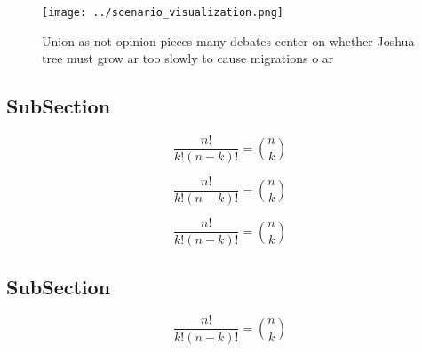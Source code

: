 \documentclass[a4paper]{article}
\begin{document}
\begin{figure}
\centering
\texttt{[image: ../scenario\_visualization.png]}
\caption{Union as not opinion pieces many debates center on whether Joshua tree must grow ar too slowly to cause migrations o ar
}
\end{figure}
 
\subsection{SubSection}

\[ \frac{n!}{k!(n-k)!} = \binom{n}{k} \]

\[ \frac{n!}{k!(n-k)!} = \binom{n}{k} \]

\[ \frac{n!}{k!(n-k)!} = \binom{n}{k} \]

\subsection{SubSection}

\[ \frac{n!}{k!(n-k)!} = \binom{n}{k} \]
\end{document}

